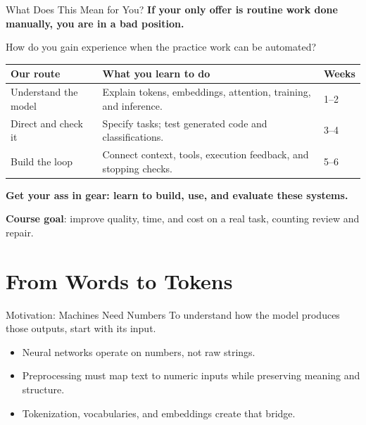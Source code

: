 \documentclass[aspectratio=169]{beamer}
\begin{document}
\begin{frame}{What Does This Mean for You?}
  \small
  \textbf{If your only offer is routine work done manually, you are in a bad position.}
  \vspace{0.4em}
  \par How do you gain experience when the practice work can be automated?
  \par\vspace{0.6em}
  {\footnotesize\renewcommand{\arraystretch}{1.3}
  \begin{tabular}{@{}>{\raggedright\arraybackslash}p{3.0cm}>{\raggedright\arraybackslash}p{7.8cm}l@{}}
    \toprule
    \textbf{Our route} & \textbf{What you learn to do} & \textbf{Weeks} \\
    \midrule
    Understand the model & Explain tokens, embeddings, attention, training, and inference. & 1--2 \\
    Direct and check it & Specify tasks; test generated code and classifications. & 3--4 \\
    Build the loop & Connect context, tools, execution feedback, and stopping checks. & 5--6 \\
    \bottomrule
  \end{tabular}}\par
  \vspace{0.5em}
  \textcolor{AMU_acc3}{\textbf{Get your ass in gear: learn to build, use, and evaluate these systems.}}
  \par\vspace{0.4em}
  \textbf{Course goal}: improve quality, time, and cost on a real task, counting review and repair.
\end{frame}

\section{From Words to Tokens}

\begin{frame}{Motivation: Machines Need Numbers}
  \small To understand how the model produces those outputs, start with its input.
  \par\vspace{0.6em}
  \begin{itemize}
    \item Neural networks operate on numbers, not raw strings.
    \item Preprocessing must map text to numeric inputs while preserving meaning and structure.
    \item Tokenization, vocabularies, and embeddings create that bridge.
  \end{itemize}
\end{frame}
\end{document}
